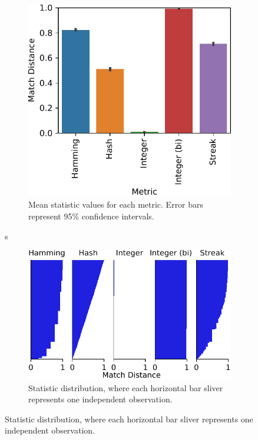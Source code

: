 \begin{figure}
\begin{center}
\begin{subfigure}[b]{\linewidth}
\begin{minipage}{0.6\linewidth}
\includegraphics[width=\linewidth]{img/sphere_reverse/bitweight=0dot5+seed=1+title=dimensionality_barplot+_data_hathash_hash=93f97a11cb443d35+_script_fullcat_hash=03ce1e318a24a109+ext=}
\end{minipage}
\begin{minipage}{0.35\linewidth}
\caption{
Mean statistic values for each metric.
Error bars represent 95\% confidence intervals.
}
\label{fig:sphere_reverse_distnplot}
\end{minipage}
\end{subfigure}
s
\begin{subfigure}[b]{\columnwidth}
\centering
\includegraphics[width=\columnwidth]{img/sphere_reverse/bitweight=0dot5+seed=1+title=dimensionality_distnplot+_data_hathash_hash=93f97a11cb443d35+_script_fullcat_hash=03ce1e318a24a109+ext=}
\caption{
Statistic distribution, where each horizontal bar sliver represents one independent observation.
}
\label{fig:sphere_reverse_barplot}
\end{subfigure}


\end{center}
\end{figure}
